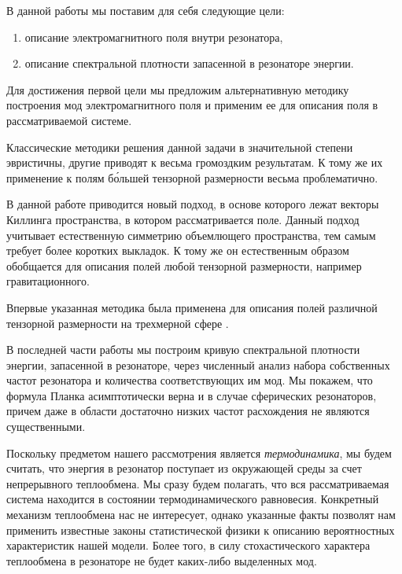     В данной работы мы поставим для себя следующие цели:
    \begin{enumerate}[nosep]
        \item описание электромагнитного поля внутри резонатора,
        \item описание спектральной плотности запасенной в резонаторе энергии.
    \end{enumerate}

    Для достижения первой цели мы предложим альтернативную методику построения мод электромагнитного поля и применим ее для описания поля в рассматриваемой системе.

    Классические методики решения данной задачи в значительной степени эвристичны, другие приводят к весьма громоздким результатам. К тому же их применение к полям б\'{о}льшей тензорной размерности весьма проблематично. \cite{burlankov_tmf}

    В данной работе приводится новый подход, в основе которого лежат векторы Киллинга пространства, в котором рассматривается поле. Данный подход учитывает естественную симметрию объемлющего пространства, тем самым требует более коротких выкладок. К тому же он естественным образом обобщается для описания полей любой тензорной размерности, например гравитационного. \cite{burlankov_tmf}

    Впервые указанная методика была применена для описания полей различной тензорной размерности на трехмерной сфере \cite{burlankov_tmf}.

    В последней части работы мы построим кривую спектральной плотности энергии, запасенной в резонаторе, через численный анализ набора собственных частот резонатора и количества соответствующих им мод. Мы покажем, что формула Планка асимптотически верна и в случае сферических резонаторов, причем даже в области достаточно низких частот расхождения не являются существенными.

    Поскольку предметом нашего рассмотрения является \textit{термодинамика}, мы будем считать, что энергия в резонатор поступает из окружающей среды за счет непрерывного теплообмена. Мы сразу будем полагать, что вся рассматриваемая система находится в состоянии термодинамического равновесия. Конкретный механизм теплообмена нас не интересует, однако указанные факты позволят нам применить известные законы статистической физики к описанию вероятностных характеристик нашей модели. Более того, в силу стохастического характера теплообмена в резонаторе не будет каких-либо выделенных мод.
